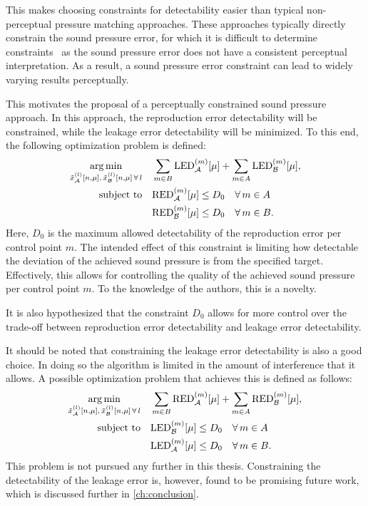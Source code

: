 This makes choosing constraints for detectability easier than typical non-perceptual pressure matching approaches.
These approaches typically directly constrain the sound pressure error, for which it is difficult to determine constraints~\cite{shi2021generation} as the sound pressure error does not have a consistent perceptual interpretation.
As a result, a sound pressure error constraint can lead to widely varying results perceptually.

This motivates the proposal of a perceptually constrained sound pressure approach.
In this approach, the reproduction error detectability will be constrained, while the leakage error detectability will be minimized.
To this end, the following optimization problem is defined:
\begin{equation}
    \begin{aligned}
    \operatorname*{arg\,min}_{\tilde{x}_{\mathcal{A}}^{(l)}[n,\mu],\,\tilde{x}_{\mathcal{B}}^{(l)}[n,\mu]\,\forall\,l}\quad 
       & \sum_{m\in B}\text{LED}_{\mathcal{A}}^{(m)}[\mu] + \sum_{m\in A}\text{LED}_{\mathcal{B}}^{(m)}[\mu],\\
        \operatorname*{subject\,\,to}\quad & \text{RED}_{\mathcal{A}}^{(m)}[\mu] \leq D_0 \quad\forall\, m\in A\\
                    & \text{RED}_{\mathcal{B}}^{(m)}[\mu] \leq D_0 \quad\forall\, m\in B.
    \end{aligned}
    \label{eq:perceptual_constrained}
\end{equation}
Here, $D_0$ is the maximum allowed detectability of the reproduction error per control point $m$.
The intended effect of this constraint is limiting how detectable the deviation of the achieved sound pressure is from the specified target.
Effectively, this allows for controlling the quality of the achieved sound pressure per control point $m$. 
To the knowledge of the authors, this is a novelty.

It is also hypothesized that the constraint $D_0$ allows for more control over the trade-off between reproduction error detectability and leakage error detectability.

It should be noted that constraining the leakage error detectability is also a good choice.
In doing so the algorithm is limited in the amount of interference that it allows. 
A possible optimization problem that achieves this is defined as follows: 
\begin{equation}
    \begin{aligned}
    \operatorname*{arg\,min}_{\tilde{x}_{\mathcal{A}}^{(l)}[n,\mu],\,\tilde{x}_{\mathcal{B}}^{(l)}[n,\mu]\,\forall\,l}\quad 
       & \sum_{m\in B}\text{RED}_{\mathcal{A}}^{(m)}[\mu] + \sum_{m\in A}\text{RED}_{\mathcal{B}}^{(m)}[\mu],\\
        \operatorname*{subject\,\,to}\quad & \text{LED}_{\mathcal{B}}^{(m)}[\mu] \leq D_0 \quad\forall\, m\in A\\
                    & \text{LED}_{\mathcal{A}}^{(m)}[\mu] \leq D_0 \quad\forall\, m\in B.
    \end{aligned}
\end{equation}
This problem is not pursued any further in this thesis.
Constraining the detectability of the leakage error is, however, found to be promising future work, which is discussed further in \autoref{ch:conclusion}.
